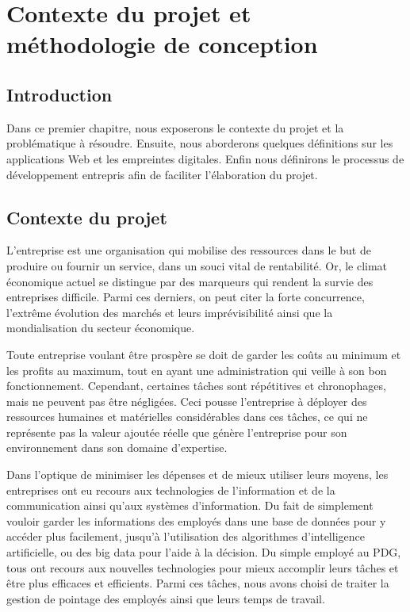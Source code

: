\chapter{Contexte du projet et méthodologie de
conception}
\renewcommand{\headrulewidth}{1pt}


\section{Introduction}
Dans ce premier chapitre, nous exposerons le contexte du projet et la
problématique à résoudre. Ensuite, nous aborderons quelques définitions sur les
applications Web et les empreintes digitales. Enfin nous définirons le processus de
développement entrepris afin de faciliter l’élaboration du projet.


\section{Contexte du projet}
L’entreprise est une organisation qui mobilise des ressources dans le but de
produire ou fournir un service, dans un souci vital de rentabilité. Or, le
climat économique actuel se distingue par des marqueurs qui rendent la survie
des entreprises difficile. Parmi ces derniers, on peut citer la forte
concurrence, l’extrême évolution des marchés et leurs imprévisibilité ainsi que
la mondialisation du secteur économique. 

Toute entreprise voulant être prospère se doit de garder les coûts au minimum et
les profits au maximum, tout en ayant une administration qui veille à son bon
fonctionnement. Cependant, certaines tâches sont répétitives et chronophages,
mais ne peuvent pas être négligées. Ceci pousse l’entreprise à déployer des
ressources humaines et matérielles considérables dans ces tâches, ce qui ne
représente pas la valeur ajoutée réelle que génère l’entreprise pour son
environnement dans son domaine d’expertise. 

Dans l’optique de minimiser les dépenses et de mieux utiliser leurs moyens, les
entreprises ont eu recours aux technologies de l’information et de la
communication ainsi qu’aux systèmes d’information. Du fait de simplement vouloir
garder les informations des employés dans une base de données pour y accéder
plus facilement, jusqu’à l’utilisation des algorithmes d’intelligence
artificielle, ou des big data pour l’aide à la décision. Du simple employé au
PDG, tous ont recours aux nouvelles technologies pour mieux accomplir leurs
tâches et être plus efficaces et efficients. Parmi ces tâches, nous avons choisi
de traiter la gestion de pointage des employés ainsi que leurs temps de travail.  

